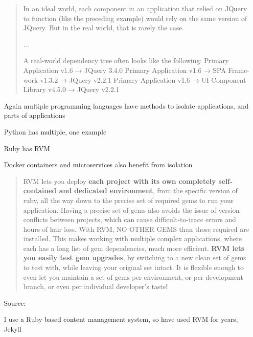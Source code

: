 \documentclass[Screen16to9,17pt]{foils}
\begin{document}


\begin{quote}
In an ideal world, each component in an application that relied on JQuery to function
(like the preceding example) would rely on the same version of JQuery. But in the
real world, that is rarely the case.

...

A real-world dependency tree often looks like the following:
Primary Application v1.6 → JQuery 3.4.0 Primary Application v1.6 → SPA Frame‐
work v1.3.2 → JQuery v2.2.1 Primary Application v1.6 → UI Component Library
v4.5.0 → JQuery v2.2.1
\end{quote}

\begin{list2}
\item Again multiple programming languages have methods to isolate applications, and parts of applications
\item Python has multiple, one example 
\item Ruby has RVM 
\item Docker containers and microservices also benefit from isolation
\end{list2}





\begin{quote}
RVM lets you deploy {\bf each project with its own completely self-contained and dedicated environment}, from the specific version of ruby, all the way down to the precise set of required gems to run your application. Having a precise set of gems also avoids the issue of version conflicts between projects, which can cause difficult-to-trace errors and hours of hair loss. With RVM, NO OTHER GEMS than those required are installed. This makes working with multiple complex applications, where each has a long list of gem dependencies, much more efficient. {\bf RVM lets you easily test gem upgrades}, by switching to a new clean set of gems to test with, while leaving your original set intact. It is flexible enough to even let you maintain a set of gems per environment, or per development branch, or even per individual developer's taste!
\end{quote}
Source: 

\begin{list2}
\item I use a Ruby based content management system, so have used RVM for years, Jekyll 
\end{list2}
\end{document}

